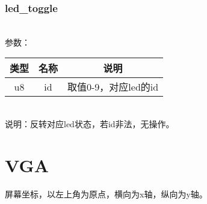 \subsubsection{led\_toggle}
\\
参数：\\
\begin{tabular}{|c|c|c|}
    \hline
    类型 & 名称 & 说明\\\hline
    u8 & id & 取值0-9，对应led的id\\\hline
\end{tabular}\\
说明：反转对应led状态，若id非法，无操作。

\section{VGA}
屏幕坐标，以左上角为原点，横向为x轴，纵向为y轴。
